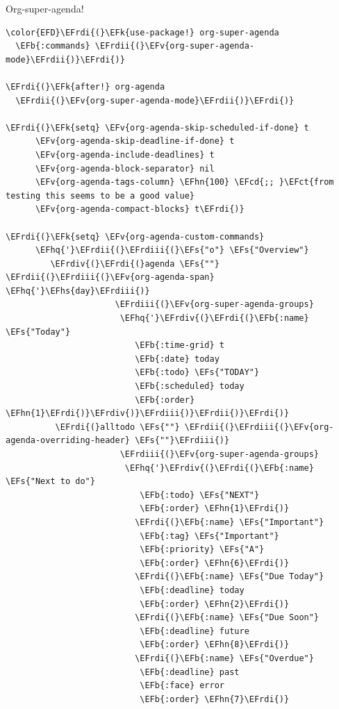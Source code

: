 \documentclass{scrartcl}
\newcommand{\EFk}[1]{\textcolor{EFk}{#1}} %
\newcommand{\EFs}[1]{\textcolor{EFs}{#1}} %
\newcommand{\EFb}[1]{\textcolor{EFb}{#1}} %
\newcommand{\EFct}[1]{\textcolor{EFct}{#1}} %
\newcommand{\EFv}[1]{\textcolor{EFv}{#1}} %
\newcommand{\EFcd}[1]{\textcolor{EFcd}{#1}} %
\newcommand{\EFhn}[1]{\textcolor{EFhn}{\textbf{#1}}} %
\newcommand{\EFhq}[1]{\textcolor{EFhq}{#1}} %
\newcommand{\EFhs}[1]{\textcolor{EFhs}{#1}} %
\newcommand{\EFrdi}[1]{\textcolor{EFrdi}{#1}} %
\newcommand{\EFrdii}[1]{\textcolor{EFrdii}{#1}} %
\newcommand{\EFrdiii}[1]{\textcolor{EFrdiii}{#1}} %
\newcommand{\EFrdiv}[1]{\textcolor{EFrdiv}{#1}} %
\begin{document}
Org-super-agenda!
\begin{Code}
\begin{Verbatim}[]
\color{EFD}\EFrdi{(}\EFk{use-package!} org-super-agenda
  \EFb{:commands} \EFrdii{(}\EFv{org-super-agenda-mode}\EFrdii{)}\EFrdi{)}

\EFrdi{(}\EFk{after!} org-agenda
  \EFrdii{(}\EFv{org-super-agenda-mode}\EFrdii{)}\EFrdi{)}

\EFrdi{(}\EFk{setq} \EFv{org-agenda-skip-scheduled-if-done} t
      \EFv{org-agenda-skip-deadline-if-done} t
      \EFv{org-agenda-include-deadlines} t
      \EFv{org-agenda-block-separator} nil
      \EFv{org-agenda-tags-column} \EFhn{100} \EFcd{;; }\EFct{from testing this seems to be a good value}
      \EFv{org-agenda-compact-blocks} t\EFrdi{)}

\EFrdi{(}\EFk{setq} \EFv{org-agenda-custom-commands}
      \EFhq{'}\EFrdii{(}\EFrdiii{(}\EFs{"o"} \EFs{"Overview"}
         \EFrdiv{(}\EFrdi{(}agenda \EFs{""} \EFrdii{(}\EFrdiii{(}\EFv{org-agenda-span} \EFhq{'}\EFhs{day}\EFrdiii{)}
                      \EFrdiii{(}\EFv{org-super-agenda-groups}
                       \EFhq{'}\EFrdiv{(}\EFrdi{(}\EFb{:name} \EFs{"Today"}
                          \EFb{:time-grid} t
                          \EFb{:date} today
                          \EFb{:todo} \EFs{"TODAY"}
                          \EFb{:scheduled} today
                          \EFb{:order} \EFhn{1}\EFrdi{)}\EFrdiv{)}\EFrdiii{)}\EFrdii{)}\EFrdi{)}
          \EFrdi{(}alltodo \EFs{""} \EFrdii{(}\EFrdiii{(}\EFv{org-agenda-overriding-header} \EFs{""}\EFrdiii{)}
                       \EFrdiii{(}\EFv{org-super-agenda-groups}
                        \EFhq{'}\EFrdiv{(}\EFrdi{(}\EFb{:name} \EFs{"Next to do"}
                           \EFb{:todo} \EFs{"NEXT"}
                           \EFb{:order} \EFhn{1}\EFrdi{)}
                          \EFrdi{(}\EFb{:name} \EFs{"Important"}
                           \EFb{:tag} \EFs{"Important"}
                           \EFb{:priority} \EFs{"A"}
                           \EFb{:order} \EFhn{6}\EFrdi{)}
                          \EFrdi{(}\EFb{:name} \EFs{"Due Today"}
                           \EFb{:deadline} today
                           \EFb{:order} \EFhn{2}\EFrdi{)}
                          \EFrdi{(}\EFb{:name} \EFs{"Due Soon"}
                           \EFb{:deadline} future
                           \EFb{:order} \EFhn{8}\EFrdi{)}
                          \EFrdi{(}\EFb{:name} \EFs{"Overdue"}
                           \EFb{:deadline} past
                           \EFb{:face} error
                           \EFb{:order} \EFhn{7}\EFrdi{)}

\end{Verbatim}
\end{Code}
\end{document}
